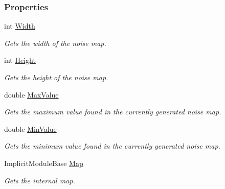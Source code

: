 \subsubsection*{Properties}
\begin{DoxyCompactItemize}
\item 
int \hyperlink{class_midnight_blue_1_1_noise_map_a09a672256f9fb4c529e8052e428c18d2}{Width}
\begin{DoxyCompactList}\small\item\em Gets the width of the noise map. \end{DoxyCompactList}\item 
int \hyperlink{class_midnight_blue_1_1_noise_map_abfffdfa7bb7a696e495bbfb2e6ac0c57}{Height}
\begin{DoxyCompactList}\small\item\em Gets the height of the noise map. \end{DoxyCompactList}\item 
double \hyperlink{class_midnight_blue_1_1_noise_map_ac7a1a8a255b1512b1d09751b68636a32}{Max\+Value}
\begin{DoxyCompactList}\small\item\em Gets the maximum value found in the currently generated noise map. \end{DoxyCompactList}\item 
double \hyperlink{class_midnight_blue_1_1_noise_map_a4b3978175deb42036e5a5e4f0ce5692e}{Min\+Value}
\begin{DoxyCompactList}\small\item\em Gets the minimum value found in the currently generated noise map. \end{DoxyCompactList}\item 
Implicit\+Module\+Base \hyperlink{class_midnight_blue_1_1_noise_map_a428d013274d19ed0775adc6d32f00719}{Map}
\begin{DoxyCompactList}\small\item\em Gets the internal map. \end{DoxyCompactList}\end{DoxyCompactItemize}


